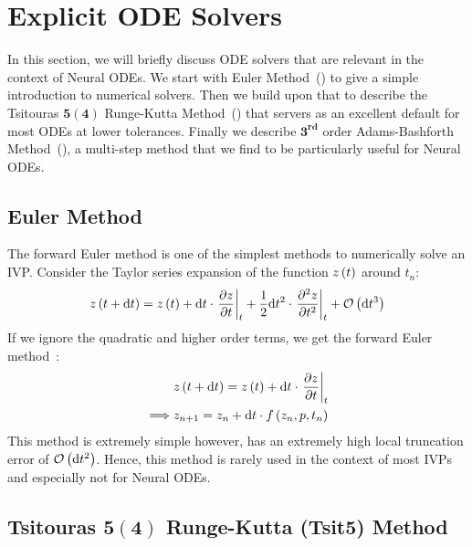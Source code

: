 \section{Explicit ODE Solvers}
\label{subsec:explicit_ode_solvers}

In this section, we will briefly discuss ODE solvers that are relevant in the context of Neural ODEs. We start with Euler Method~() to give a simple introduction to numerical solvers. Then we build upon that to describe the Tsitouras $\mathbf{5 (4)}$ Runge-Kutta Method~() that servers as an excellent default for most ODEs at lower tolerances. Finally we describe $\mathbf{3^{rd}}$ order Adams-Bashforth Method~(), a multi-step method that we find to be particularly useful for Neural ODEs.

\subsection{Euler Method}
\label{subsec:euler_method}

The forward Euler method is one of the simplest methods to numerically solve an IVP. Consider the Taylor series expansion of the function $z\left(t\right)$ around $t_n$:
%
\begin{equation}
  z\left(t + \mathrm{d}t\right) = z\left(t\right) + \mathrm{d}t \cdot \left. \frac{\partial z}{\partial t} \right|_{t} + \frac{1}{2} \mathrm{d}t^2 \cdot \left. \frac{\partial^2 z}{\partial t^2} \right|_{t} + \mathcal{O}\left(\mathrm{d}t^3\right)
\end{equation}
%
If we ignore the quadratic and higher order terms, we get the forward Euler method~\citep{euler1824institutionum}:
%
\begin{align}
           & z\left(t + \mathrm{d}t\right) = z\left(t\right) + \mathrm{d}t \cdot \left. \frac{\partial z}{\partial t} \right|_{t} \\
  \implies & z_{n + 1} = z_n + \mathrm{d}t \cdot f\left(z_n, p, t_n\right)
\end{align}
%
This method is extremely simple however, has an extremely high local truncation error of $\mathcal{O}\left(\mathrm{d}t^2\right)$. Hence, this method is rarely used in the context of most IVPs and especially not for Neural ODEs.

\subsection{Tsitouras $\mathbf{5 (4)}$ Runge-Kutta (Tsit5) Method}
\label{subsec:tsit5_method}

